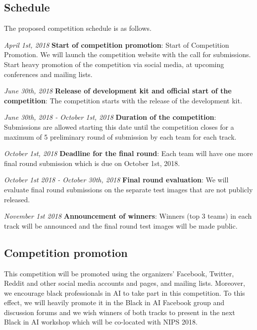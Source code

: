 \documentclass[11pt, oneside]{article}
\begin{document}
\subsection{Schedule}

The proposed competition schedule is as follows.

{\it April 1st, 2018} {\bf Start of competition promotion}: Start of Competition Promotion. We will launch the competition website with the call for submissions. Start heavy promotion of the competition via social media, at upcoming conferences and mailing lists.

{\it June 30th, 2018} {\bf Release of development kit and official start of the competition}: The competition starts with the release of the development kit. 

{\it June 30th, 2018 - October 1st, 2018} {\bf Duration of the competition}: Submissions are allowed starting this date until the competition closes for a maximum of 5 preliminary round of submission by each team for each track. 

{\it October 1st, 2018} {\bf Deadline for the final round}: Each team will have one more final round submission which is due on October 1st, 2018.

{\it October 1st 2018 - October 30th, 2018} {\bf Final round evaluation}: We will evaluate final round submissions on the separate test images that are not publicly released.

{\it November 1st 2018} {\bf Announcement of winners}: Winners (top 3 teams) in each track will be announced and the final round test images will be made public.

\subsection{Competition promotion}

This competition will be promoted using the organizers' Facebook, Twitter, Reddit and other social media accounts and pages, and mailing lists. Moreover, we encourage black professionals in AI to take part in this competition. To this effect, we will heavily promote it in the Black in AI Facebook group and discussion forums and we wish winners of both tracks to present in the next Black in AI workshop which will be co-located with NIPS 2018.
\end{document}
